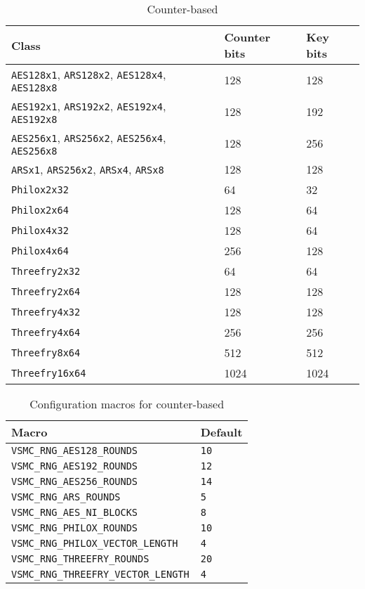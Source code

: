 \begin{table}
  \tbfigures
  \begin{tabularx}{\textwidth}{p{3in}YY}
    \toprule
    Class & Counter bits & Key bits \\
    \midrule
    \verb|AES128x1|, \verb|ARS128x2|, \verb|AES128x4|, \verb|AES128x8|
    & 128 & 128 \\
    \verb|AES192x1|, \verb|ARS192x2|, \verb|AES192x4|, \verb|AES192x8|
    & 128 & 192 \\
    \verb|AES256x1|, \verb|ARS256x2|, \verb|AES256x4|, \verb|AES256x8|
    & 128 & 256 \\
    \verb|ARSx1|, \verb|ARS256x2|, \verb|ARSx4|, \verb|ARSx8| & 128 & 128 \\
    \verb|Philox2x32|    & 64   & 32   \\
    \verb|Philox2x64|    & 128  & 64   \\
    \verb|Philox4x32|    & 128  & 64   \\
    \verb|Philox4x64|    & 256  & 128  \\
    \verb|Threefry2x32|  & 64   & 64   \\
    \verb|Threefry2x64|  & 128  & 128  \\
    \verb|Threefry4x32|  & 128  & 128  \\
    \verb|Threefry4x64|  & 256  & 256  \\
    \verb|Threefry8x64|  & 512  & 512  \\
    \verb|Threefry16x64| & 1024 & 1024 \\
    \bottomrule
  \end{tabularx}
  \caption{Counter-based \protect\rng}
  \label{tab:Counter-based RNG}
\end{table}

\begin{table}
  \begin{tabularx}{\textwidth}{XX}
    \toprule
    Macro & Default \\
    \midrule
    \verb|VSMC_RNG_AES128_ROUNDS|          & \verb|10| \\
    \verb|VSMC_RNG_AES192_ROUNDS|          & \verb|12| \\
    \verb|VSMC_RNG_AES256_ROUNDS|          & \verb|14| \\
    \verb|VSMC_RNG_ARS_ROUNDS|             & \verb|5|  \\
    \verb|VSMC_RNG_AES_NI_BLOCKS|          & \verb|8|  \\
    \verb|VSMC_RNG_PHILOX_ROUNDS|          & \verb|10| \\
    \verb|VSMC_RNG_PHILOX_VECTOR_LENGTH|   & \verb|4|  \\
    \verb|VSMC_RNG_THREEFRY_ROUNDS|        & \verb|20| \\
    \verb|VSMC_RNG_THREEFRY_VECTOR_LENGTH| & \verb|4|  \\
    \bottomrule
  \end{tabularx}
  \caption{Configuration macros for counter-based \protect\rng}
  \label{tab:Configuration macros for counter-based RNG}
\end{table}

